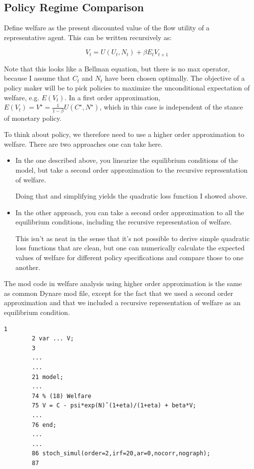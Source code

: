 \documentclass[cn,10pt,math=newtx,citestyle=gb7714-2015,bibstyle=gb7714-2015]{elegantbook}
\begin{document}
	
	
	\subsection{Policy Regime Comparison}
	
	Define welfare as the present discounted value of the flow utility of a representative agent. This can be written recursively as:
	
	$$V_t=U(U_t,N_t)+\beta E_tV_{t+1}$$
	
	Note that this looks like a Bellman equation, but there is no max operator, because I assume that $C_t$ and $N_t$ have been chosen optimally. The objective of a policy maker will be to pick policies to maximize the unconditional expectation of welfare, e.g. $E(V_t)$. In a first order approximation, $E(V_t) = V^{\star} = \frac{1}{1-\beta}U(C^{\star},N^{\star})$, which in this case is independent of the stance of monetary policy.
	
	To think about policy, we therefore need to use a higher order approximation to welfare. There are two approaches one can take here.
	\begin{itemize}
		\item In the one described above, you linearize the equilibrium conditions of the model, but take a second order approximation to the recursive representation of welfare.
		
		Doing that and simplifying yields the quadratic loss function I showed above.
		\item In the other approach, you can take a second order approximation to all the equilibrium conditions, including the recursive representation of welfare.
		
		This isn't as neat in the sense that it's not possible to derive simple quadratic loss functions that are clean, but one can numerically calculate the expected values of welfare for different policy specifications and compare those to one another.
	\end{itemize}
	
	The mod code in welfare analysis using higher order approximation is the same as common Dynare mod file, except for the fact that we used a second order approximation and that we included a recursive representation of welfare as an equilibrium condition.
	
	\begin{lstlisting}[frame=shadowbox]
		1 
		2 var ... V;
		3
		...
		...
		21 model;
		...
		74 % (18) Welfare
		75 V = C - psi*exp(N)ˆ(1+eta)/(1+eta) + beta*V;
		...
		76 end;
		...
		...
		86 stoch_simul(order=2,irf=20,ar=0,nocorr,nograph);
		87
	\end{lstlisting}
	
\end{document}
